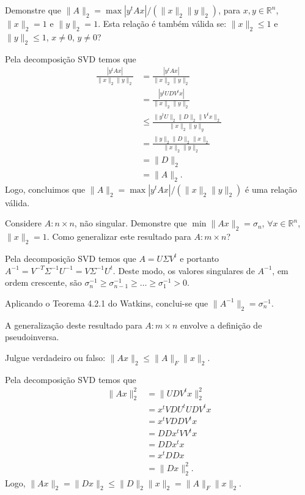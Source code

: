 \documentclass[a4paper,12pt, leqno, answers]{exam}
\begin{document}
\begin{questions}
    \question Demonstre que $\| A \|_2 = \max | y^t A x | / \left( \| x \|_2 \| y \|_2 \right)$, para $x, y \in \mathbb{R}^n$, $\| x \|_2 = 1$ e $\| y \|_2 = 1$. Esta rela\c{c}\~{a}o \'{e} tamb\'{e}m v\'{a}lida se: $\| x \|_2 \leq 1$ e $\| y \|_2 \leq 1$, $x \neq 0$, $y \neq 0$?
    \begin{solution}
        Pela decomposi\c{c}\~{a}o SVD temos que
        \begin{align*}
            \frac{| y^t A x |}{\| x \|_2 \| y \|_2} &= \frac{| y^t A x|}{\| x \|_2 \| y \|_2} \\
            &= \frac{| y^t U D V^t x |}{\| x \|_2 \| y \|_2} \\
            &\leq \frac{\| y^t U \|_2 \| D \|_2 \| V^t x \|_2}{\| x \|_2 \| y \|_y} \\
            &= \frac{\| y \|_2 \| D \|_2 \| x \|_2}{\| x \|_2 \| y \|_2} \\
            &= \| D \|_2 \\
            &= \| A \|_2.
        \end{align*}
        Logo, concluimos que $\| A \|_2 = \max | y^t A x | / \left( \| x \|_2 \| y \|_2 \right)$ \'{e} uma rela\c{c}\~{a}o v\'{a}lida. 
    \end{solution}

    \question Considere $A : n \times n$, n\~{a}o singular. Demonstre que $\min \| A x \|_2 = \sigma_n$, $\forall x \in \mathbb{R}^n$, $\| x \|_2 = 1$. Como generalizar este resultado para $A : m \times n$?
    \begin{solution}
        Pela decomposi\c{c}\~{a}o SVD temos que $A = U \Sigma V^t$ e portanto $A^{-1} = V^{-T} \Sigma^{-1} U^{-1} = V \Sigma^{-1} U^t$. Deste modo, os valores singulares de $A^{-1}$, em ordem crescente, s\~{a}o $\sigma_n^{-1} \geq \sigma_{n - 1}^{-1} \geq \ldots \geq \sigma_1^{-1} > 0$.

        Aplicando o Teorema 4.2.1 do Watkins\nocite{Watkins:2004:fundamentals}, conclui-se que $\| A^{-1} \|_2 = \sigma_n^{-1}$.

        A generaliza\c{c}\~{a}o deste resultado para $A : m \times n$ envolve a defini\c{c}\~{a}o de pseudoinversa.
    \end{solution}

    \question Julgue verdadeiro ou falso: $\| A x \|_2 \leq \| A \|_F \| x \|_2$.
    \begin{solution}
        Pela decomposi\c{c}\~{a}o SVD temos que
        \begin{align*}
            \| A x \|_2^2 &= \| U D V^t x \|_2^2 \\
            &= x^t V D U^t U D V^t x \\
            &= x^t V D D V^t x \\
            &= D D x^t V V^t x \\
            &= D D x^t x \\
            &= x^t D D x \\
            &= \| D x \|_2^2.
        \end{align*}
        Logo, $\| A x \|_2 = \| D x \|_2 \leq \| D \|_2 \| x \|_2 = \| A \|_F \| x \|_2$.
    \end{solution}


\end{questions}
\end{document}
